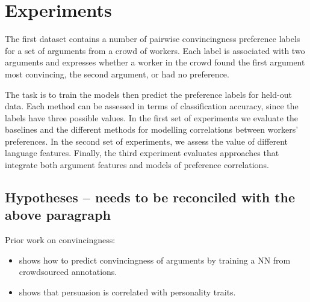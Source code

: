 \section{Experiments}\label{sec:expts}

The first dataset contains a number of pairwise convincingness preference labels for a set of arguments from a crowd of workers. Each label is associated with two arguments and expresses whether a worker in the crowd found the first argument most convincing, the second argument, or had no preference.  

The task is to train the models then predict the preference labels for held-out data. Each method can be assessed in terms of classification accuracy, since the labels have three possible values. In the first set of experiments we evaluate the baselines and the different methods for modelling correlations between workers' preferences. In the second set of experiments, we assess the value of different language features. Finally, the third experiment evaluates approaches that integrate both argument features and models of preference correlations.

\subsection{Hypotheses -- needs to be reconciled with the above paragraph} 

Prior work on convincingness:
\begin{itemize}
 \item \cite{habernal2016argument} shows how to predict convincingness of arguments by training a NN 
 from crowdsourced annotations. 
 \item \cite{lukin2017argument} shows that persuasion is correlated with personality traits.
\end{itemize}

